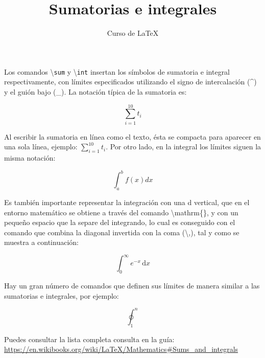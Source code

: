 \documentclass[12pt,letterpaper]{article}
\author{Curso de \LaTeX}
\title{Sumatorias e integrales}
\begin{document}
\maketitle

Los comandos \textbackslash \texttt{sum} y \textbackslash \texttt{int} insertan los símbolos de sumatoria e integral respectivamente, con límites especificados utilizando el signo de intercalación (\^\space) y el guión bajo (\_). La notación típica de la sumatoria es:

\begin{equation}
\sum_{i=1}^{10} t_i
\end{equation}

Al escribir la sumatoria en línea como el texto, ésta se compacta para aparecer en una sola línea, ejemplo: $ \sum_{i=1}^{10} t_i $. Por otro lado, en la integral los límites siguen la misma notación:

\begin{equation}
\int_a^b f(x) dx
\end{equation}

Es también importante representar la integración con una d vertical, que en el entorno matemático se obtiene a través del comando \textbackslash mathrm\{\}, y con un pequeño espacio que la separe del integrando, lo cual es conseguido con el comando que combina la diagonal invertida con la coma (\textbackslash ,), tal y como se muestra a continuación:

\begin{equation}
\int_0^\infty e^{-x}\,\mathrm{d}x
\end{equation}

Hay un gran número de comandos que definen sus límites de manera similar a las sumatorias e integrales, por ejemplo:

\begin{displaymath}
\oint_1^n
\end{displaymath}

Puedes consultar la lista completa consulta en la guía: \url{https://en.wikibooks.org/wiki/LaTeX/Mathematics#Sums\_and\_integrals}
\end{document}

